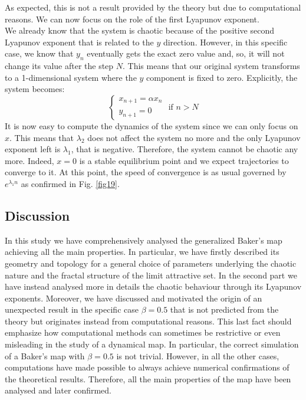 \documentclass[11pt,titlepage]{article}
\begin{document}
As expected, this is not a result provided by the theory but due to computational reasons. We can now focus on the role of the first Lyapunov exponent. \\
We already know that the system is chaotic because of the positive second Lyapunov exponent that is related to the $y$ direction. However, in this specific case, we know that $y_n$ eventually gets the exact zero value and, so, it will not change its value after the step $N$. This means that our original system transforms to a 1-dimensional system where the $y$ component is fixed to zero. Explicitly, the system becomes:
\begin{equation*}
	\begin{cases}
		x_{n+1} = \alpha x_n \\
		y_{n+1} = 0
	\end{cases}
 	\text{ if } n > N
\end{equation*}
It is now easy to compute the dynamics of the system since we can only focus on $x$.  This means that $\lambda_2$ does not affect the system no more and the only Lyapunov exponent left is $\lambda_1$, that is negative. Therefore, the system cannot be chaotic any more. Indeed, $x=0$ is a stable equilibrium point and we expect trajectories to converge to it. At this point, the speed of convergence is as usual governed by $e^{\lambda_1 n}$ as confirmed in Fig. \ref{fig19}.



\subsection{Discussion} %
In this study we have comprehensively analysed the generalized Baker's map achieving all the main properties. In particular, we have firstly described its geometry and topology for a general choice of parameters underlying the chaotic nature and the fractal structure of the limit attractive set. In the second part we have instead analysed more in details the chaotic behaviour through its Lyapunov exponents. Moreover, we have discussed and motivated the origin of an unexpected result in the specific case $\beta=0.5$ that is not predicted from the theory but originates instead from computational reasons. This last fact should emphasize how computational methods can sometimes be restrictive or even misleading in the study of a dynamical map. In particular, the correct simulation of a Baker's map with $\beta=0.5$ is not trivial. However, in all the other cases, computations have made possible to always achieve numerical confirmations of the theoretical results. Therefore, all the main properties of the map have been analysed and later confirmed.
\end{document}
